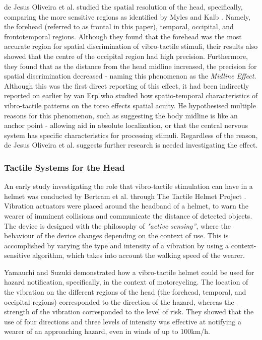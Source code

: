 \documentclass{interim}
\begin{document}
de Jesus Oliveira et al. \cite{7463147} studied the spatial resolution of the head, specifically, comparing the more sensitive regions as identified by Myles and Kalb \cite{headguidelines}. Namely, the forehead (referred to as frontal in this paper), temporal, occipital, and frontotemporal regions. Although they found that the forehead was the most accurate region for spatial discrimination of vibro-tactile stimuli, their results also showed that the centre of the occipital region had high precision. Furthermore, they found that as the distance from the head midline increased, the precision for spatial discrimination decreased - naming this phenomenon as the \textit{Midline Effect}. Although this was the first direct reporting of this effect, it had been indirectly reported on earlier by van Erp \cite{1406917} who studied how spatio-temporal characteristics of vibro-tactile patterns on the torso effects spatial acuity. He hypothesised multiple reasons for this phenomenon, such as suggesting the body midline is like an anchor point - allowing aid in absolute localization, or that the central nervous system has specific characteristics for processing stimuli. Regardless of the reason, de Jesus Oliveira et al. suggests further research is needed investigating the effect.


\subsubsection{Tactile Systems for the Head}
An early study investigating the role that vibro-tactile stimulation can have in a helmet was conducted by Bertram et al. through The Tactile Helmet Project \cite{10.1007/978-3-642-39802-5_3}. Vibration actuators were placed around the headband of a helmet, to warn the wearer of imminent collisions and communicate the distance of detected objects. The device is designed with the philosophy of \textit{"active sensing”}, where the behaviour of the device changes depending on the context of use. This is accomplished by varying the type and intensity of a vibration by using a context-sensitive algorithm, which takes into account the walking speed of the wearer.

Yamauchi and Suzuki \cite{yamauchi2020vibro} demonstrated how a vibro-tactile helmet could be used for hazard notification, specifically, in the context of motorcycling. The location of the vibration on the different regions of the head (the forehead, temporal, and occipital regions) corresponded to the direction of the hazard, whereas the strength of the vibration corresponded to the level of risk. They showed that the use of four directions and three levels of intensity was effective at notifying a wearer of an approaching hazard, even in winds of up to 100km/h.
\end{document}
